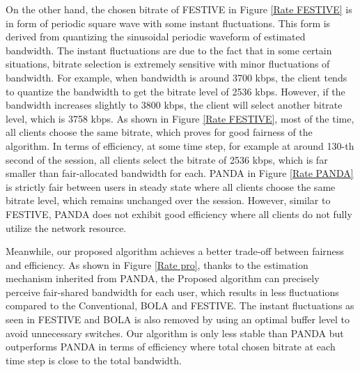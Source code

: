 \documentclass[journal]{IEEEtran}
\begin{document}
\par On the other hand, the chosen bitrate of FESTIVE in Figure \ref{Rate FESTIVE} is in form of periodic square wave with some instant fluctuations. This form is derived from quantizing the sinusoidal periodic waveform of estimated bandwidth. The instant fluctuations are due to the fact that in some certain situations, bitrate selection is extremely sensitive with minor fluctuations of bandwidth. For example, when bandwidth is around 3700 kbps, the client tends to quantize the bandwidth to get the bitrate level of 2536 kbps. However, if the bandwidth increases slightly to 3800 kbps, the client will select another bitrate level, which is 3758 kbps. As shown in Figure \ref{Rate FESTIVE}, most of the time, all clients choose the same bitrate, which proves for good fairness of the algorithm. In terms of efficiency, at some time step, for example at around 130-th second of the session, all clients select the bitrate of 2536 kbps, which is far smaller than fair-allocated bandwidth for each. PANDA in Figure \ref{Rate PANDA} is strictly fair between users in steady state where all clients choose the same bitrate level, which remains unchanged over the session. However, similar to FESTIVE, PANDA does not exhibit good efficiency where all clients do not fully utilize the network resource. 
\par Meanwhile, our proposed algorithm achieves a better trade-off between fairness and efficiency. As shown in Figure \ref{Rate pro}, thanks to the estimation mechanism inherited from PANDA, the Proposed algorithm can precisely perceive fair-shared bandwidth for each user, which results in less fluctuations compared to the Conventional, BOLA and FESTIVE. The instant fluctuations as seen in FESTIVE and BOLA is also removed by using an optimal buffer level to avoid unnecessary switches. Our algorithm is only less stable than PANDA but outperforms PANDA in terms of efficiency where total chosen bitrate at each time step is close to the total bandwidth. 
\end{document}
